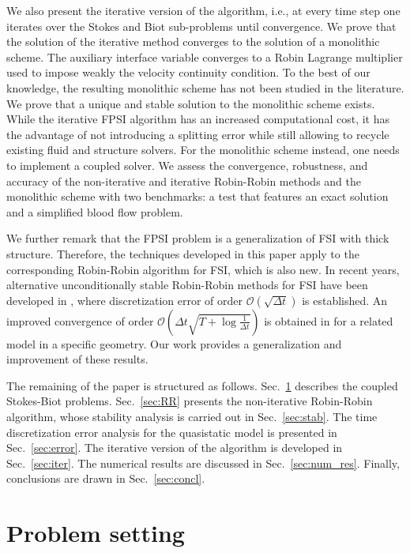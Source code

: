 \documentclass[11pt]{article}
\begin{document}
We also present the iterative version of the algorithm, i.e., at every time step one iterates over the Stokes and Biot sub-problems until convergence. We prove that the solution of the iterative method converges to the solution of a monolithic scheme. The auxiliary interface variable converges to a Robin Lagrange multiplier used to impose weakly the velocity continuity condition. To the best of our knowledge, the resulting monolithic scheme has not been studied in the literature. We prove that a unique and stable solution to the monolithic scheme exists.
While the iterative FPSI algorithm has an increased computational cost, it has the advantage of not introducing a splitting error while still allowing to recycle existing fluid and structure solvers. 
For the monolithic scheme instead, one needs to implement a coupled solver. 
We assess the convergence, robustness, and accuracy
of the non-iterative and iterative Robin-Robin methods and the monolithic scheme with 
two benchmarks: a test that features an exact solution and a simplified blood flow problem.

We further remark that the FPSI problem is a generalization of FSI with thick structure. Therefore, the techniques developed in this paper apply to the corresponding Robin-Robin algorithm for FSI, which is also new. In recent years, alternative unconditionally stable Robin-Robin methods for FSI have been developed in \cite{Seb-Buc-FSI,BDFG22,BDFG22-discrete}, where discretization error of order $\mathcal{O}(\sqrt{\Delta t})$ is established. An improved convergence of order $\mathcal{O}(\Delta t\sqrt{T + \log\frac{1}{\Delta t}})$ is obtained in \cite{BDFG23} for a related model in a specific geometry. Our work provides a generalization and improvement of these results. 

The remaining of the paper is structured as follows. Sec.~\ref{sec:problem} describes the coupled Stokes-Biot problems. Sec.~\ref{sec:RR} presents the non-iterative Robin-Robin algorithm, whose stability analysis is carried out in Sec.~\ref{sec:stab}. The time discretization error analysis for the quasistatic model is presented in Sec.~\ref{sec:error}. The iterative version of the algorithm is developed in Sec.~\ref{sec:iter}. The numerical results are discussed in Sec.~\ref{sec:num_res}. Finally, conclusions are drawn in Sec.~\ref{sec:concl}.


\section{Problem setting}\label{sec:problem}
\end{document}
